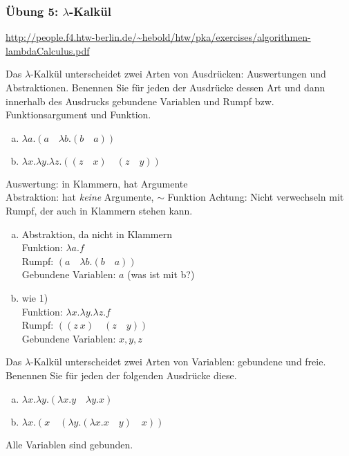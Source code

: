 \begin{card}
	\frametitle{Übung 5: $\lambda$-Kalkül}
	\url{http://people.f4.htw-berlin.de/~hebold/htw/pka/exercises/algorithmen-lambdaCalculus.pdf}
\end{card}

\begin{card}
	Das $\lambda$-Kalkül unterscheidet zwei Arten von Ausdrücken: Auswertungen und Abstraktionen. Benennen Sie für jeden der Ausdrücke dessen Art und dann innerhalb des Ausdrucks gebundene Variablen und Rumpf bzw. Funktionsargument und Funktion. 
	\begin{enumerate}[a)]
	\item $\lambda a.(a \quad \lambda b.(b \quad a))$
	\item $\lambda x.\lambda y.\lambda z.((z \quad x) \quad (z \quad y))$
	\end{enumerate}
	\hr
	Auswertung: in Klammern, hat Argumente\\
	Abstraktion: hat \textit{keine} Argumente, $\sim$ Funktion
	Achtung: Nicht verwechseln mit Rumpf, der auch in Klammern stehen kann.
	\begin{enumerate}[a)]
	\item Abstraktion, da nicht in Klammern\\
	Funktion: $\lambda a.f$\\
	Rumpf: $(a \quad \lambda b.(b \quad a))$\\
	Gebundene Variablen: $a$ (was ist mit b?)
	\item wie 1)\\
	Funktion: $\lambda x.\lambda y.\lambda z.f$ \\
	Rumpf: $((z \ x) \quad (z \quad y))$\\
	Gebundene Variablen: $x,y,z$
	\end{enumerate}
\end{card}

\begin{card}
	Das $\lambda$-Kalkül unterscheidet zwei Arten von Variablen: gebundene und freie. Benennen Sie für jeden der folgenden Ausdrücke diese.
	\begin{enumerate}[a)]
	\item $\lambda x.\lambda y.(\lambda x.y \quad \lambda y.x)$
	\item $\lambda x.(x \quad (\lambda y.(\lambda x.x \quad y) \quad x))$
	\end{enumerate}
	\hr
	Alle Variablen sind gebunden.
\end{card}

